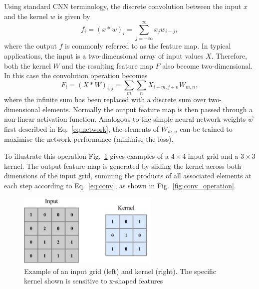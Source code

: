 Using standard CNN terminology, the discrete convolution between the input $x$ and the kernel $w$
is given by
\begin{equation}
    f_{i}=(x*w)_{i}=\sum^{\infty}_{j=-\infty}x_{j}w_{i-j},
\end{equation}
where the output $f$ is commonly referred to as the feature map. In typical applications, the
input is a two-dimensional array of input values $X$. Therefore, both the kernel $W$ and the
resulting feature map $F$ also become two-dimensional. In this case the convolution operation
becomes
\begin{equation}
    F_{i}=(X*W)_{i,j}=\sum_{m}\sum_{n}X_{i+m,j+n}W_{m,n},
    \label{eq:conv}
\end{equation}
where the infinite sum has been replaced with a discrete sum over two-dimensional elements.
Normally the output feature map is then passed through a non-linear activation function. Analogous
to the simple neural network weights $\vec{w}$ first described in Eq.~\ref{eq:network}, the
elements of $W_{m,n}$ can be trained to maximise the network performance (minimise the loss).

To illustrate this operation Fig.~\ref{fig:conv_input} gives examples of a $4 \times 4$ input grid
and a $3 \times 3$ kernel. The output feature map is generated by sliding the kernel across both
dimensions of the input grid, summing the products of all associated elements at each step
according to Eq.~\ref{eq:conv}, as shown in Fig.~\ref{fig:conv_operation}.

\begin{figure} %
    \includegraphics[width=0.6\textwidth]{diagrams/6-cvn/conv_input.pdf}
    \caption[Example of an input grid and kernel.]
    {Example of an input grid (left) and kernel (right). The specific kernel shown is sensitive to
        x-shaped features}
    \label{fig:conv_input}
\end{figure}

